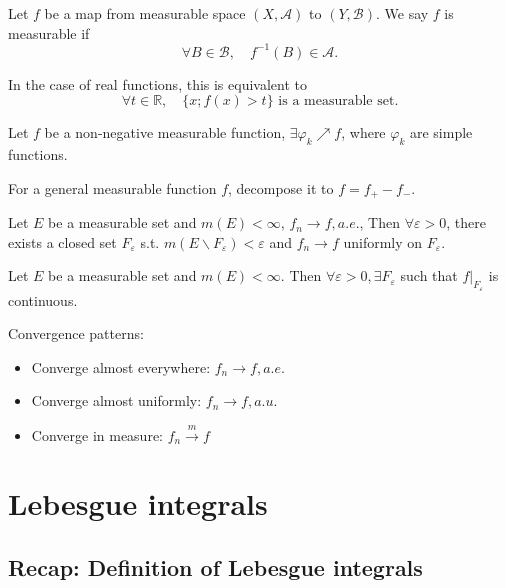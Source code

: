 \begin{definition}
	Let $f$ be a map from measurable space $(X, \mathcal{A})$ to $(Y, \mathcal{B})$.
	We say $f$ is measurable if
	 \[
	\forall B\in \mathcal{B}, \quad f^{-1}(B)\in \mathcal{A}
	.\]
	
	In the case of real functions, this is equivalent to
	\[
		\forall t\in \mathbb{R}, \quad \{x; f(x)>t\} \text{ is a measurable set}
	.\]
\end{definition}

\begin{proposition}
    Let $f$ be a non-negative measurable function,
	$\exists \varphi_k \nearrow f$,
	where $\varphi_k$ are simple functions.

	For a general measurable function $f$, decompose it to $f=f_+-f_-$. 
\end{proposition}

\begin{theorem}[Egorov]
    Let $E$ be a measurable set and $m(E)<\infty$, $f_n\to f, a.e.$,
	Then  $\forall\varepsilon>0$, there exists a closed set $F_\varepsilon$ s.t.
	$m(E\backslash F_{\varepsilon})<\varepsilon$ and
	$f_n\to f$ uniformly on $F_{\varepsilon}$.
\end{theorem}

\begin{theorem}[Lusin]
    Let $E$ be a measurable set and  $m(E)<\infty$.
	Then $\forall \varepsilon>0, \exists F_{\varepsilon}$ such that
	$f \big|_{F_\varepsilon}$ is continuous.
\end{theorem}

Convergence patterns:
\begin{itemize}
	\item Converge almost everywhere: $f_n\to f, a.e.$
	\item Converge almost uniformly: $f_n\to f, a.u.$
	\item Converge in measure: $f_n\xrightarrow{m} f$
\end{itemize}

\section{Lebesgue integrals}
\label{sec:Lebesgue integrals}

\subsection{Recap: Definition of Lebesgue integrals}
\label{sub:Definition of Lebesgue integrals}

